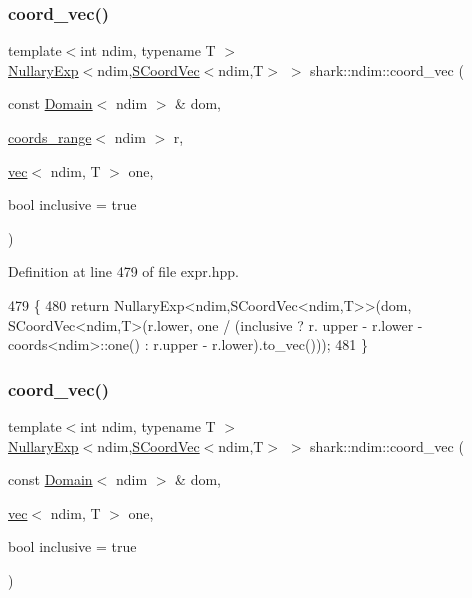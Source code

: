 \subsubsection{\texorpdfstring{coord\+\_\+vec()}{coord\_vec()}\hspace{0.1cm}{\footnotesize\ttfamily [2/3]}}
{\footnotesize\ttfamily template$<$int ndim, typename T $>$ \\
\hyperlink{classshark_1_1ndim_1_1_nullary_exp}{Nullary\+Exp}$<$ndim,\hyperlink{classshark_1_1ndim_1_1_s_coord_vec}{S\+Coord\+Vec}$<$ndim,T$>$ $>$ shark\+::ndim\+::coord\+\_\+vec (\begin{DoxyParamCaption}\item[{const \hyperlink{classshark_1_1ndim_1_1_domain}{Domain}$<$ ndim $>$ \&}]{dom,  }\item[{\hyperlink{structshark_1_1ndim_1_1coords__range}{coords\+\_\+range}$<$ ndim $>$}]{r,  }\item[{\hyperlink{structshark_1_1ndim_1_1vec}{vec}$<$ ndim, T $>$}]{one,  }\item[{bool}]{inclusive = {\ttfamily true} }\end{DoxyParamCaption})}



Definition at line 479 of file expr.\+hpp.


\begin{DoxyCode}
479                                                                                                            
                                     \{
480             \textcolor{keywordflow}{return} NullaryExp<ndim,SCoordVec<ndim,T>>(dom, SCoordVec<ndim,T>(r.lower, one / (inclusive ? r.
      upper - r.lower - coords<ndim>::one() : r.upper - r.lower).to\_vec()));
481         \}
\end{DoxyCode}
\hypertarget{namespaceshark_1_1ndim_a6beec51528cef95c43479d8e4c378c99}{}\label{namespaceshark_1_1ndim_a6beec51528cef95c43479d8e4c378c99} 
\subsubsection{\texorpdfstring{coord\+\_\+vec()}{coord\_vec()}\hspace{0.1cm}{\footnotesize\ttfamily [3/3]}}
{\footnotesize\ttfamily template$<$int ndim, typename T $>$ \\
\hyperlink{classshark_1_1ndim_1_1_nullary_exp}{Nullary\+Exp}$<$ndim,\hyperlink{classshark_1_1ndim_1_1_s_coord_vec}{S\+Coord\+Vec}$<$ndim,T$>$ $>$ shark\+::ndim\+::coord\+\_\+vec (\begin{DoxyParamCaption}\item[{const \hyperlink{classshark_1_1ndim_1_1_domain}{Domain}$<$ ndim $>$ \&}]{dom,  }\item[{\hyperlink{structshark_1_1ndim_1_1vec}{vec}$<$ ndim, T $>$}]{one,  }\item[{bool}]{inclusive = {\ttfamily true} }\end{DoxyParamCaption})}



